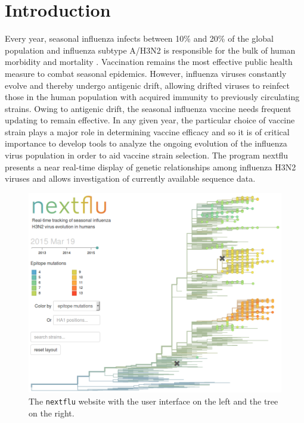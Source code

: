 \documentclass{bioinfo}
\begin{document}
\section*{Introduction}

Every year, seasonal influenza infects between 10\% and 20\% of the global population and influenza subtype A/H3N2 is responsible for the bulk of human morbidity and mortality \citep{flufactsheet}.
Vaccination remains the most effective public health measure to combat seasonal epidemics.
However, influenza viruses constantly evolve and thereby undergo antigenic drift, allowing drifted viruses to reinfect those in the human population with acquired immunity to previously circulating strains.
Owing to antigenic drift, the seasonal influenza vaccine needs frequent updating to remain effective.
In any given year, the particular choice of vaccine strain plays a major role in determining vaccine efficacy and so it is of critical importance to develop tools to analyze the ongoing evolution of the influenza virus population in order to aid vaccine strain selection.
The program nextflu presents a near real-time display of genetic relationships among influenza H3N2 viruses and allows investigation of currently available sequence data.

\begin{figure}[t!]
	\begin{center}
	\includegraphics[width=0.99\columnwidth]{figures/tree}
\caption[]{The \texttt{nextflu} website with the user interface on the left and
the tree on the right.}
\label{fig:tree}
\end{center}
\end{figure}
\end{document}
